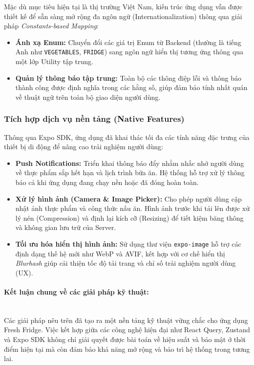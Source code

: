 Mặc dù mục tiêu hiện tại là thị trường Việt Nam, kiến trúc ứng dụng vẫn được thiết kế để sẵn sàng mở rộng đa ngôn ngữ (Internationalization) thông qua giải pháp \textit{Constants-based Mapping}:

\begin{itemize}
    \item \textbf{Ánh xạ Enum:} Chuyển đổi các giá trị Enum từ Backend (thường là tiếng Anh như \texttt{VEGETABLES}, \texttt{FRIDGE}) sang ngôn ngữ hiển thị tương ứng thông qua một lớp Utility tập trung.
    \item \textbf{Quản lý thông báo tập trung:} Toàn bộ các thông điệp lỗi và thông báo thành công được định nghĩa trong các hằng số, giúp đảm bảo tính nhất quán về thuật ngữ trên toàn bộ giao diện người dùng.
\end{itemize}

\subsubsection{Tích hợp dịch vụ nền tảng (Native Features)}

Thông qua Expo SDK, ứng dụng đã khai thác tối đa các tính năng đặc trưng của thiết bị di động để nâng cao trải nghiệm người dùng:

\begin{itemize}
    \item \textbf{Push Notifications:} Triển khai thông báo đẩy nhằm nhắc nhở người dùng về thực phẩm sắp hết hạn và lịch trình bữa ăn. Hệ thống hỗ trợ xử lý thông báo cả khi ứng dụng đang chạy nền hoặc đã đóng hoàn toàn.
    \item \textbf{Xử lý hình ảnh (Camera \& Image Picker):} Cho phép người dùng cập nhật ảnh thực phẩm và công thức nấu ăn. Hình ảnh trước khi tải lên được xử lý nén (Compression) và định lại kích cỡ (Resizing) để tiết kiệm băng thông và không gian lưu trữ của Server.
    \item \textbf{Tối ưu hóa hiển thị hình ảnh:} Sử dụng thư viện \texttt{expo-image} hỗ trợ các định dạng thế hệ mới như WebP và AVIF, kết hợp với cơ chế hiển thị \textit{Blurhash} giúp cải thiện tốc độ tải trang và chỉ số trải nghiệm người dùng (UX).
\end{itemize}

\paragraph{Kết luận chung về các giải pháp kỹ thuật:} ~\\

Các giải pháp nêu trên đã tạo ra một nền tảng kỹ thuật vững chắc cho ứng dụng Fresh Fridge. Việc kết hợp giữa các công nghệ hiện đại như React Query, Zustand và Expo SDK không chỉ giải quyết được bài toán về hiệu suất và bảo mật ở thời điểm hiện tại mà còn đảm bảo khả năng mở rộng và bảo trì hệ thống trong tương lai.